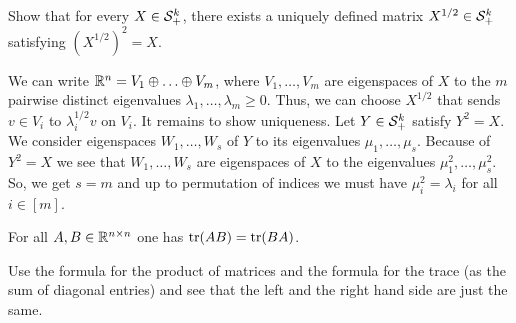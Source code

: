 \begin{exercise}
	\label{matrix:root}
	Show that for every $X \in \mathcal{S}_+^k$, there exists a uniquely defined matrix $X^{1/2} \in \mathcal{S}_+^k$ satisfying $(X^{1/2})^2 = X$. 
\end{exercise}
\begin{solution}
	We can write $\mathbb{R}^n = V_1 \oplus \ldots \oplus V_m$, where $V_1,\ldots,V_m$ are eigenspaces of $X$ to the $m$ pairwise distinct eigenvalues $\lambda_1,\ldots,\lambda_m \ge 0$. Thus, we can choose $X^{1/2}$ that sends $v \in V_i$ to $\lambda_i^{1/2} v$ on $V_i$. It remains to show uniqueness. Let $Y \in \mathcal{S}_+^k$ satisfy $Y^2 = X$. We consider eigenspaces $W_1,\ldots,W_s$ of $Y$ to its eigenvalues $\mu_1,\ldots,\mu_s$. Because of $Y^2=X$ we see that $W_1,\ldots,W_s$ are eigenspaces of $X$ to the eigenvalues $\mu_1^2,\ldots,\mu_s^2$. So, we get $s=m$ and up to permutation of indices we must have $\mu_i^2 = \lambda_i$ for all $i \in [m]$.
\end{solution}

\begin{exercise}
	\label{interchange}
	For all $A, B \in \mathbb{R}^{n \times n}$ one has $\operatorname{tr}(AB)=\operatorname{tr}(BA)$. 
\end{exercise}
\begin{solution}
	Use the formula for the product of matrices and the formula for the trace (as the sum of diagonal entries) and see that the left and the right hand side are just the same. 
\end{solution}

